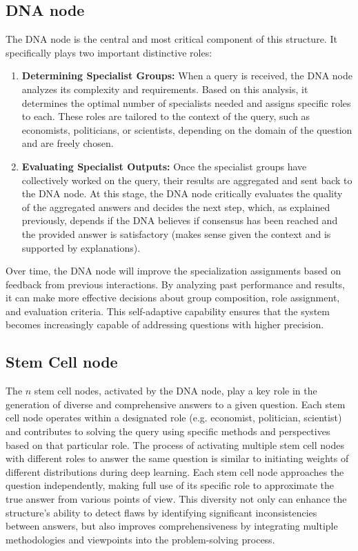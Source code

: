 \subsection{DNA node}
The DNA node is the central and most critical component of this structure. It specifically plays two important distinctive roles:
\begin{enumerate}
    \item \textbf{Determining Specialist Groups:} When a query is received, the DNA node analyzes its complexity and requirements. Based on this analysis, it determines the optimal number of specialists needed and assigns specific roles to each. These roles are tailored to the context of the query, such as economists, politicians, or scientists, depending on the domain of the question and are freely chosen. 
    
    \item \textbf{Evaluating Specialist Outputs:} Once the specialist groups have collectively worked on the query, their results are aggregated and sent back to the DNA node. At this stage, the DNA node critically evaluates the quality of the aggregated answers and decides the next step, which, as explained previously, depends if the DNA believes if consensus has been reached and the provided answer is satisfactory (makes sense given the context and is supported by explanations).
    
\end{enumerate}
Over time, the DNA node will improve the specialization assignments based on feedback from previous interactions. By analyzing past performance and results, it can make more effective decisions about group composition, role assignment, and evaluation criteria. This self-adaptive capability ensures that the system becomes increasingly capable of addressing questions with higher precision.

\subsection{Stem Cell node}
The $n$ stem cell nodes, activated by the DNA node, play a key role in the generation of diverse and comprehensive answers to a given question. Each stem cell node operates within a designated role (e.g. economist, politician, scientist) and contributes to solving the query using specific methods and perspectives based on that particular role. The process of activating multiple stem cell nodes with different roles to answer the same question is similar to initiating weights of different distributions during deep learning. Each stem cell node approaches the question independently, making full use of its specific role to approximate the true answer from various points of view. This diversity not only can enhance the structure's ability to detect flaws by identifying significant inconsistencies between answers, but also improves comprehensiveness by integrating multiple methodologies and viewpoints into the problem-solving process. 

